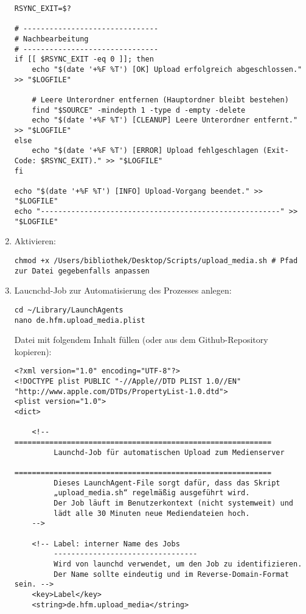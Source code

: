 \documentclass[12pt,a4paper]{report}
\begin{document}
\begin{enumerate}
\begin{verbatim}
RSYNC_EXIT=$?

# -------------------------------
# Nachbearbeitung
# -------------------------------
if [[ $RSYNC_EXIT -eq 0 ]]; then
    echo "$(date '+%F %T') [OK] Upload erfolgreich abgeschlossen." >> "$LOGFILE"

    # Leere Unterordner entfernen (Hauptordner bleibt bestehen)
    find "$SOURCE" -mindepth 1 -type d -empty -delete
    echo "$(date '+%F %T') [CLEANUP] Leere Unterordner entfernt." >> "$LOGFILE"
else
    echo "$(date '+%F %T') [ERROR] Upload fehlgeschlagen (Exit-Code: $RSYNC_EXIT)." >> "$LOGFILE"
fi

echo "$(date '+%F %T') [INFO] Upload-Vorgang beendet." >> "$LOGFILE"
echo "-------------------------------------------------------" >> "$LOGFILE"
    \end{verbatim}

    \item Aktivieren:
    \begin{verbatim}
chmod +x /Users/bibliothek/Desktop/Scripts/upload_media.sh # Pfad zur Datei gegebenfalls anpassen
    \end{verbatim}

    \item Laucnchd-Job zur Automatisierung des Prozesses anlegen:
    \begin{verbatim}
cd ~/Library/LaunchAgents
nano de.hfm.upload_media.plist
    \end{verbatim}

    Datei mit folgendem Inhalt füllen (oder aus dem Github-Repository kopieren):

    \begin{verbatim}
<?xml version="1.0" encoding="UTF-8"?>
<!DOCTYPE plist PUBLIC "-//Apple//DTD PLIST 1.0//EN" "http://www.apple.com/DTDs/PropertyList-1.0.dtd">
<plist version="1.0">
<dict>

    <!-- ===========================================================
         Launchd-Job für automatischen Upload zum Medienserver
         ===========================================================
         Dieses LaunchAgent-File sorgt dafür, dass das Skript
         „upload_media.sh“ regelmäßig ausgeführt wird.
         Der Job läuft im Benutzerkontext (nicht systemweit) und
         lädt alle 30 Minuten neue Mediendateien hoch.
    -->

    <!-- Label: interner Name des Jobs
         ---------------------------------
         Wird von launchd verwendet, um den Job zu identifizieren.
         Der Name sollte eindeutig und im Reverse-Domain-Format sein. -->
    <key>Label</key>
    <string>de.hfm.upload_media</string>


\end{verbatim}
\end{enumerate}
\end{document}
